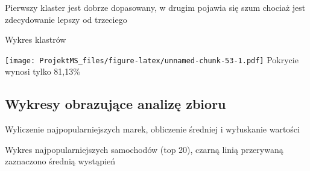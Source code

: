 \documentclass[
]{article}
\newenvironment{Shaded}{\begin{snugshade}}{\end{snugshade}}
\newcommand{\DataTypeTok}[1]{\textcolor[rgb]{0.13,0.29,0.53}{#1}}
\newcommand{\DecValTok}[1]{\textcolor[rgb]{0.00,0.00,0.81}{#1}}
\newcommand{\KeywordTok}[1]{\textcolor[rgb]{0.13,0.29,0.53}{\textbf{#1}}}
\newcommand{\NormalTok}[1]{#1}
\newcommand{\OperatorTok}[1]{\textcolor[rgb]{0.81,0.36,0.00}{\textbf{#1}}}
\newcommand{\OtherTok}[1]{\textcolor[rgb]{0.56,0.35,0.01}{#1}}
\newcommand{\StringTok}[1]{\textcolor[rgb]{0.31,0.60,0.02}{#1}}
\begin{document}
Pierwszy klaster jest dobrze dopasowany, w drugim pojawia się szum
chociaż jest zdecydowanie lepszy od trzeciego

Wykres klastrów

\begin{Shaded}
\end{Shaded}

\texttt{[image: ProjektMS\_files/figure-latex/unnamed-chunk-53-1.pdf]}
Pokrycie wynosi tylko 81,13\%

\hypertarget{wykresy-obrazujux105ce-analizux119-zbioru}{%
\subsection{Wykresy obrazujące analizę
zbioru}\label{wykresy-obrazujux105ce-analizux119-zbioru}}

Wyliczenie najpopularniejszych marek, obliczenie średniej i wyłuskanie
wartości

\begin{Shaded}
\end{Shaded}

Wykres najpopularniejszych samochodów (top 20), czarną linią przerywaną
zaznaczono średnią wystąpień
\end{document}
